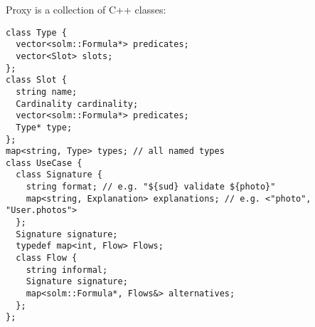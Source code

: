 \documentclass{article}
\begin{document}
    \clearpage
    Proxy is a collection of C++ classes:
    
    \begin{verbatim}
class Type {
  vector<solm::Formula*> predicates;
  vector<Slot> slots;
};
class Slot {
  string name;
  Cardinality cardinality;
  vector<solm::Formula*> predicates;
  Type* type;
};
map<string, Type> types; // all named types
class UseCase {
  class Signature {
    string format; // e.g. "${sud} validate ${photo}"
    map<string, Explanation> explanations; // e.g. <"photo", "User.photos">
  };
  Signature signature;
  typedef map<int, Flow> Flows;
  class Flow {
    string informal;
    Signature signature;
    map<solm::Formula*, Flows&> alternatives;
  };
};
\end{verbatim}
\end{document}
